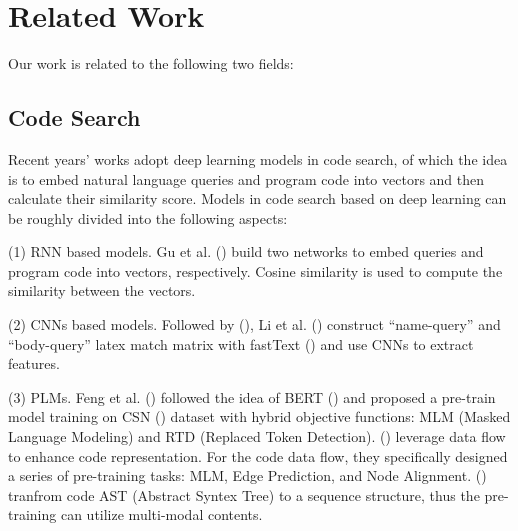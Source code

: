 
\section{Related Work}

Our work is related to the following two fields: 

\subsection{Code Search}
Recent years’ works adopt deep learning models in code search, 
of which the idea is to embed natural language queries and program code into vectors 
and then calculate their similarity score. Models in code search based on deep learning can be roughly 
divided into the following aspects:

(1) RNN based models. Gu et al. (\citealp{DeepCS})
build two networks to embed queries and program code into vectors, respectively. 
Cosine similarity is used to compute the similarity between the vectors. 

(2) CNNs based models. Followed by (\citealp{DeepCS}), Li et al. (\citealp{CQIL}) construct “name-query” 
and “body-query” latex match matrix with fastText (\citealp{fastText}) and use 
CNNs to extract features.  

(3) PLMs. Feng et al. (\citealp{CodeBERT}) followed the idea of BERT (\citealp{BERT}) 
and proposed a pre-train model training on CSN (\citealp{CodeSearchNet}) 
dataset with hybrid objective functions: MLM (Masked Language Modeling) 
and RTD (Replaced Token Detection). (\citealp{GraphCodeBERT}) leverage data flow to 
enhance code representation. 
For the code data flow, they specifically designed a series of pre-training tasks: 
MLM, Edge Prediction, and Node Alignment. (\citealp{UniXcoder}) 
tranfrom code AST (Abstract Syntex Tree) to a sequence structure, 
thus the pre-training can utilize multi-modal contents. 




